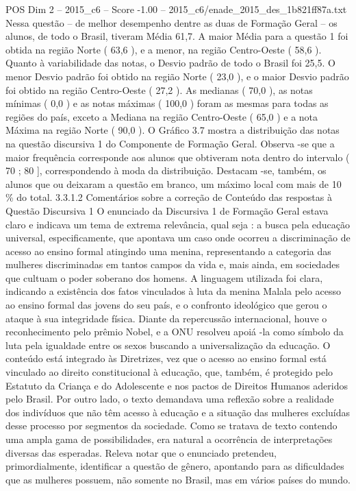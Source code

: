 \begin{textsample}{POS Dim 2 – 2015\_c6 – Score -1.00 – 2015\_c6/enade\_2015\_des\_1b821ff87a.txt}
Nessa questão – de melhor desempenho dentre as duas de Formação Geral – os alunos, de todo o Brasil, tiveram Média 61,7.
A maior Média para a questão 1 foi obtida na região Norte ( 63,6 ), e a menor, na região Centro-Oeste ( 58,6 ).
Quanto à variabilidade das notas, o Desvio padrão de todo o Brasil foi 25,5.
O menor Desvio padrão foi obtido na região Norte ( 23,0 ), e o maior Desvio padrão foi obtido na região Centro-Oeste ( 27,2 ).
As medianas ( 70,0 ), as notas mínimas ( 0,0 ) e as notas máximas ( 100,0 ) foram as mesmas para todas as regiões do país, exceto a Mediana na região Centro-Oeste ( 65,0 ) e a nota Máxima na região Norte ( 90,0 ).
O Gráfico 3.7 mostra a distribuição das notas na questão discursiva 1 do Componente de Formação Geral.
Observa -se que a maior frequência corresponde aos alunos que obtiveram nota dentro do intervalo ( 70 ; 80 ], correspondendo à moda da distribuição.
Destacam -se, também, os alunos que ou deixaram a questão em branco, um máximo local com mais de 10 \% do total. 3.3.1.2 Comentários sobre a correção de Conteúdo das respostas à Questão Discursiva 1 O enunciado da Discursiva 1 de Formação Geral estava claro e indicava um tema de extrema relevância, qual seja : a busca pela educação universal, especificamente, que apontava um caso onde ocorreu a discriminação de acesso ao ensino formal atingindo uma menina, representando a categoria das mulheres discriminadas em tantos campos da vida e, mais ainda, em sociedades que cultuam o poder soberano dos homens.
A linguagem utilizada foi clara, indicando a existência dos fatos vinculados à luta da menina Malala pelo acesso ao ensino formal das jovens do seu país, e o confronto ideológico que gerou o ataque à sua integridade física.
Diante da repercussão internacional, houve o reconhecimento pelo prêmio Nobel, e a ONU resolveu apoiá -la como símbolo da luta pela igualdade entre os sexos buscando a universalização da educação.
O conteúdo está integrado às Diretrizes, vez que o acesso ao ensino formal está vinculado ao direito constitucional à educação, que, também, é protegido pelo Estatuto da Criança e do Adolescente e nos pactos de Direitos Humanos aderidos pelo Brasil.
Por outro lado, o texto demandava uma reflexão sobre a realidade dos indivíduos que não têm acesso à educação e a situação das mulheres excluídas desse processo por segmentos da sociedade.
Como se tratava de texto contendo uma ampla gama de possibilidades, era natural a ocorrência de interpretações diversas das esperadas.
Releva notar que o enunciado pretendeu, primordialmente, identificar a questão de gênero, apontando para as dificuldades que as mulheres possuem, não somente no Brasil, mas em vários países do mundo.

\end{textsample}
